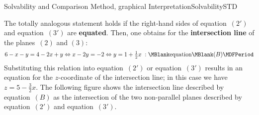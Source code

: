 \begin{MXContent}{Solvability and Comparison Method, graphical Interpretation}{Solvability}{STD}
\begin{MExample}
\begin{center}
{
}%
\end{center}
The totally analogous statement holds if the right-hand sides of equation~$(2')$ and 
equation~$(3')$ are \textbf{equated}. Then, one obtains for the \textbf{intersection line}
of the planes~$(2)$ and $(3)$:
$$6 - x - y = 4 - 2 x + y \Leftrightarrow x - 2 y = - 2 \Leftrightarrow y = 1 + \Mtfrac12 x \; :
\MBlank\mbox{equation}\MBlank (B) \MDFPeriod $$
Substituting this relation into equation~$(2')$ or equation~$(3')$ results 
in an equation for the $z$-coordinate of the intersection line; in this case
we have $z=5-\frac{3}{2}x$.
The following figure shows the intersection line described by equation~$(B)$ as 
the intersection of the two non-parallel planes described by equation~$(2')$
and equation~$(3')$.


\end{MExample}
\end{MXContent}
